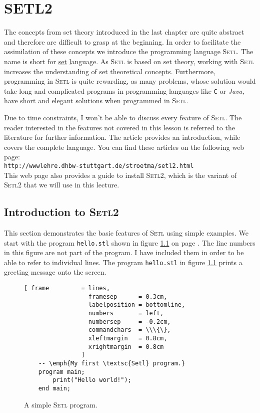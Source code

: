 \chapter{\textsc{SETL2}}
The concepts from set theory introduced in the last chapter are quite abstract and
therefore are difficult to grasp at the beginning.  In order to facilitate the
assimilation of these concepts we introduce the programming language \textsc{Setl}.  The
name is short for \underline{set} \underline{l}anguage. As \textsc{Setl} is based on set
theory, working with \textsc{Setl} increases the understanding of set theoretical
concepts.  Furthermore, programming in \textsc{Setl} is quite rewarding, as many problems,
whose solution would take long and complicated programs  in programming languages like \texttt{C} or
\textsl{Java},  have short and elegant solutions when programmed in \textsc{Setl}.

Due to time constraints, I won't be able to discuss every feature of \textsc{Setl}.
The reader interested in the features not covered in this lesson is referred to the
literature for further information.  
The article \cite{dewar79} provides an introduction, while \cite{snyder90b} covers the
complete language.  You can find these articles on the following web page:
\\[0.2cm]
\hspace*{1.3cm}
\texttt{http://wwwlehre.dhbw-stuttgart.de/stroetma/setl2.html}
\\[0.2cm]
This web page also provides a guide to install  \textsc{Setl2}, which is the variant of
\textsc{Setl2} that we will use in this lecture.

\section{Introduction to \textsc{Setl2}}
This section demonstrates the basic features of \textsc{Setl} using simple examples.
We start with the program \texttt{hello.stl} shown in figure
\ref{fig:hello} on page  \pageref{fig:hello}.  The line numbers in this figure are not
part of the program.  I have included them in order to be able to refer to individual lines.
The program \texttt{hello.stl} in figure \ref{fig:hello} prints a greeting message onto the screen.

\begin{figure}[!ht]
  \centering
\begin{Verbatim}[ frame         = lines, 
                  framesep      = 0.3cm, 
                  labelposition = bottomline,
                  numbers       = left,
                  numbersep     = -0.2cm,
                  commandchars  = \\\{\},
                  xleftmargin   = 0.8cm,
                  xrightmargin  = 0.8cm
                ]
    -- \emph{My first \textsc{Setl} program.}
    program main;
        print("Hello world!");
    end main;
\end{Verbatim}
\vspace*{-0.3cm}
  \caption{A simple \textsc{Setl} program.}
  \label{fig:hello}
\end{figure} 

